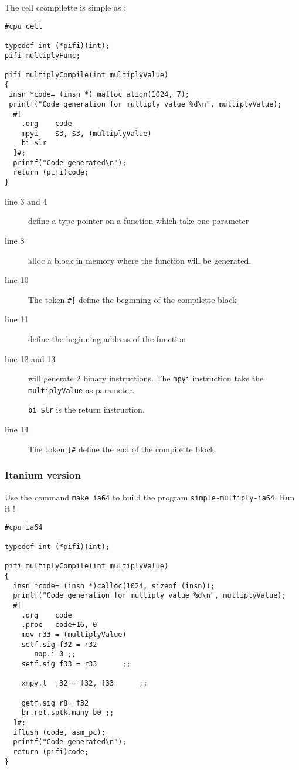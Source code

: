 \documentclass{article}
\begin{document}
The cell ccompilette is simple as :

\begin{lstlisting}
#cpu cell

typedef int (*pifi)(int);
pifi multiplyFunc; 

pifi multiplyCompile(int multiplyValue)
{
 insn *code= (insn *)_malloc_align(1024, 7);
 printf("Code generation for multiply value %d\n", multiplyValue);
  #[
	.org	code
	mpyi    $3, $3, (multiplyValue) 
	bi $lr 
  ]#;
  printf("Code generated\n");
  return (pifi)code;
}
\end{lstlisting} %

\begin{description}
\item[line 3 and 4] define a type pointer on a function which take one
  parameter
\item[line 8] alloc a block in memory where the function will be generated.
\item[line 10] The token \verb|#[| define the beginning of the
  compilette block
\item[line 11] define the beginning address of the function
\item[line 12 and 13] will generate 2 binary instructions. The
  \texttt{mpyi} instruction take the \texttt{multiplyValue} as
  parameter.

  \texttt{bi \$lr} is the return instruction.

\item[line 14] The token \verb|]#| define the end of the compilette block
\end{description}

\subsubsection{Itanium version}

Use the command \texttt{make ia64} to build the program
\texttt{simple-multiply-ia64}. Run it !

\begin{lstlisting}
#cpu ia64

typedef int (*pifi)(int);

pifi multiplyCompile(int multiplyValue)
{
  insn *code= (insn *)calloc(1024, sizeof (insn));
  printf("Code generation for multiply value %d\n", multiplyValue);
  #[
	.org	code
	.proc   code+16, 0
	mov	r33 = (multiplyValue)   
	setf.sig f32 = r32
	   nop.i 0 ;;
	setf.sig f33 = r33		;;

	xmpy.l  f32 = f32, f33 		;;

	getf.sig r8= f32
	br.ret.sptk.many b0 ;;
  ]#;
  iflush (code, asm_pc);
  printf("Code generated\n");
  return (pifi)code;
}
\end{lstlisting}
\end{document}
